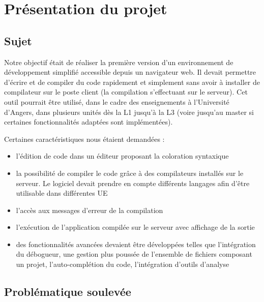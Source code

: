 \chapter{Présentation du projet}

\section{Sujet}

\par Notre objectif était de réaliser la première version d'un environnement de développement simplifié accessible depuis un navigateur web. Il devait permettre d'écrire et de compiler du code rapidement et simplement sans avoir à installer de compilateur sur le poste client (la compilation s'effectuant sur le serveur). Cet outil pourrait être utilisé, dans le cadre des enseignements à l'Université d'Angers, dans plusieurs unités dès la L1 jusqu'à la L3 (voire jusqu'au master si certaines fonctionnalités adaptées sont implémentées). \\

\par Certaines caractéristiques nous étaient demandées :

\begin{itemize}

	\item l'édition de code dans un éditeur proposant la coloration syntaxique
	\item la possibilité de compiler le code grâce à des compilateurs installés sur le serveur. Le logiciel devait prendre en compte différents langages afin d’être utilisable dans différentes UE
	\item l'accès aux messages d'erreur de la compilation
	\item l'exécution de l'application compilée sur le serveur avec affichage de la sortie
	\item des fonctionnalités avancées devaient être développées telles que l’intégration du débogueur, une gestion plus poussée de l’ensemble de fichiers composant un projet, l'auto-complétion du code, l'intégration d’outils d’analyse

\end{itemize}


\section{Problématique soulevée}

